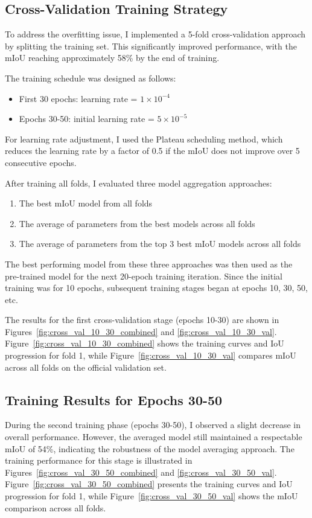 \documentclass[]{article}
\begin{document}
\subsection{Cross-Validation Training Strategy}
To address the overfitting issue, I implemented a 5-fold cross-validation approach by splitting the training set. This significantly improved performance, with the mIoU reaching approximately 58\% by the end of training.

The training schedule was designed as follows:
\begin{itemize}
    \item First 30 epochs: learning rate = $1 \times 10^{-4}$
    \item Epochs 30-50: initial learning rate = $5 \times 10^{-5}$
\end{itemize}

For learning rate adjustment, I used the Plateau scheduling method, which reduces the learning rate by a factor of 0.5 if the mIoU does not improve over 5 consecutive epochs.

After training all folds, I evaluated three model aggregation approaches:
\begin{enumerate}
    \item The best mIoU model from all folds
    \item The average of parameters from the best models across all folds
    \item The average of parameters from the top 3 best mIoU models across all folds
\end{enumerate}

The best performing model from these three approaches was then used as the pre-trained model for the next 20-epoch training iteration. Since the initial training was for 10 epochs, subsequent training stages began at epochs 10, 30, 50, etc.

The results for the first cross-validation stage (epochs 10-30) are shown in Figures~\ref{fig:cross_val_10_30_combined} and \ref{fig:cross_val_10_30_val}. Figure~\ref{fig:cross_val_10_30_combined} shows the training curves and IoU progression for fold 1, while Figure~\ref{fig:cross_val_10_30_val} compares mIoU across all folds on the official validation set.

\subsection{Training Results for Epochs 30-50}
During the second training phase (epochs 30-50), I observed a slight decrease in overall performance. However, the averaged model still maintained a respectable mIoU of 54\%, indicating the robustness of the model averaging approach. The training performance for this stage is illustrated in Figures~\ref{fig:cross_val_30_50_combined} and \ref{fig:cross_val_30_50_val}. Figure~\ref{fig:cross_val_30_50_combined} presents the training curves and IoU progression for fold 1, while Figure~\ref{fig:cross_val_30_50_val} shows the mIoU comparison across all folds.
\end{document}
